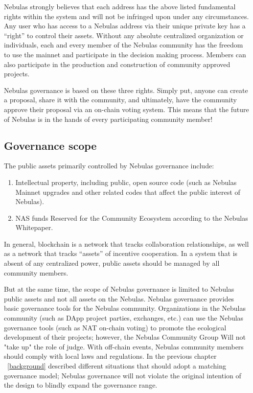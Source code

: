 Nebulas strongly believes that each address has the above listed fundamental rights within the system and will not be infringed upon under any circumstances. Any user who has access to a Nebulas address via their unique private key has a “right” to control their assets. Without any absolute centralized organization or individuals, each and every member of the Nebulas community has the freedom to use the mainnet and participate in the decision making process. Members can also participate in the production and construction of community approved projects. 

Nebulas governance is based on these three rights. Simply put, anyone can create a proposal, share it with the community, and ultimately, have the community approve their proposal via an on-chain voting system. This means that the future of Nebulas is in the hands of every participating community member!

\subsection{Governance scope}

The public assets primarily controlled by Nebulas governance include:

\begin{enumerate}
	\item Intellectual property, including public, open source code (such as Nebulas Mainnet upgrades and other related codes that affect the public interest of Nebulas).
	\item NAS funds Reserved for the Community Ecosystem according to the Nebulas Whitepaper.
\end{enumerate}

In general, blockchain is a network that tracks collaboration relationships, as well as a network that tracks “assets” of incentive cooperation. In a system that is absent of any centralized power, public assets should be managed by all community members.

But at the same time, the scope of Nebulas governance is limited to Nebulas public assets and not all assets on the Nebulas. Nebulas governance provides basic governance tools for the Nebulas community. Organizations in the Nebulas community (such as DApp project parties, exchanges, etc.) can use the Nebulas governance tools (such as NAT on-chain voting) to promote the ecological development of their projects; however, the Nebulas Community Group Will not "take up" the role of judge. With off-chain events, Nebulas community members should comply with local laws and regulations. In the previous chapter ~\ref{background} described different situations that should adopt a matching governance model; Nebulas governance will not violate the original intention of the design to blindly expand the governance range.

